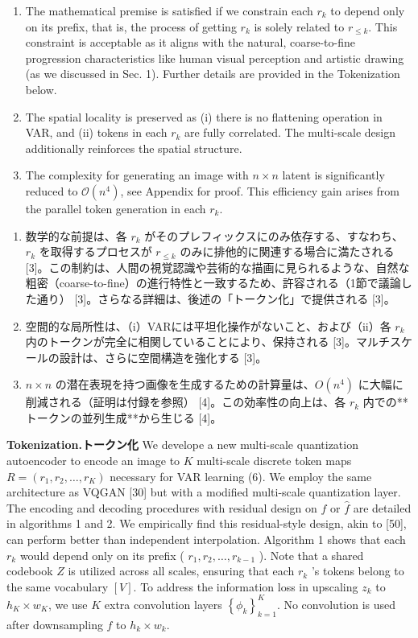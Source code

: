 \documentclass{article}
\begin{document}
\begin{enumerate}
  \item The mathematical premise is satisfied if we constrain each $r_{k}$ to depend only on its prefix, that is, the process of getting $r_{k}$ is solely related to $r_{\leq k}$. This constraint is acceptable as it aligns with the natural, coarse-to-fine progression characteristics like human visual perception and artistic drawing (as we discussed in Sec. 1). Further details are provided in the Tokenization below.
  \item The spatial locality is preserved as (i) there is no flattening operation in VAR, and (ii) tokens in each $r_{k}$ are fully correlated. The multi-scale design additionally reinforces the spatial structure.
  \item The complexity for generating an image with $n \times n$ latent is significantly reduced to $\mathcal{O}\left(n^{4}\right)$, see Appendix for proof. This efficiency gain arises from the parallel token generation in each $r_{k}$.
\end{enumerate}

\begin{enumerate}
    \item 数学的な前提は、各 $r_k$ がそのプレフィックスにのみ依存する、すなわち、$r_k$ を取得するプロセスが $r_{\le k}$ のみに排他的に関連する場合に満たされる [3]。この制約は、人間の視覚認識や芸術的な描画に見られるような、自然な粗密（coarse-to-fine）の進行特性と一致するため、許容される（1節で議論した通り） [3]。さらなる詳細は、後述の「トークン化」で提供される [3]。
    \item 空間的な局所性は、（i）VARには平坦化操作がないこと、および（ii）各 $r_k$ 内のトークンが完全に相関していることにより、保持される [3]。マルチスケールの設計は、さらに空間構造を強化する [3]。
    \item $n \times n$ の潜在表現を持つ画像を生成するための計算量は、$O(n^4)$ に大幅に削減される（証明は付録を参照） [4]。この効率性の向上は、各 $r_k$ 内での**トークンの並列生成**から生じる [4]。
\end{enumerate}

\textbf{Tokenization.トークン化} We develope a new multi-scale quantization autoencoder to encode an image to $K$ multi-scale discrete token maps $R=\left(r_{1}, r_{2}, \ldots, r_{K}\right)$ necessary for VAR learning (6). We employ the same architecture as VQGAN [30] but with a modified multi-scale quantization layer. The encoding and decoding procedures with residual design on $f$ or $\hat{f}$ are detailed in algorithms 1 and 2. We empirically find this residual-style design, akin to [50], can perform better than independent interpolation. Algorithm 1 shows that each $r_{k}$ would depend only on its prefix ( $r_{1}, r_{2}, \ldots, r_{k-1}$ ). Note that a shared codebook $Z$ is utilized across all scales, ensuring that each $r_{k}$ 's tokens belong to\\
the same vocabulary $[V]$. To address the information loss in upscaling $z_{k}$ to $h_{K} \times w_{K}$, we use $K$ extra convolution layers $\left\{\phi_{k}\right\}_{k=1}^{K}$. No convolution is used after downsampling $f$ to $h_{k} \times w_{k}$.
\end{document}
